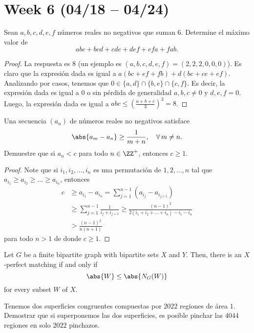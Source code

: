 \section{Week 6 (04/18 -- 04/24)}

\begin{probEG}
	Sean $a,b,c,d,e,f$ números reales no negativos que suman $6$. Determine el máximo valor de
	\[abc+bcd+cde+def+efa+fab.\]
\end{probEG}

\begin{proof}
	La respuesta es $8$ (un ejemplo es $(a,b,c,d,e,f)=(2,2,2,0,0,0)$). Es claro que la expresión dada es igual a $a(bc+ef+fb)+d(bc+ce+ef)$. Analizando por casos, tenemos que $0\in\{a,d\}\cap\{b,e\}\cap\{c,f\}$. Es decir, la expresión dada es igual a $0$ o sin pérdida de generalidad $a,b,c\ne 0$ y $d,e,f=0$. Luego, la expresión dada es igual a $abc\le\left(\frac{a+b+c}{3}\right)^3=8$.
\end{proof}

\begin{probMR}
	Una secuencia $(a_n)$ de números reales no negativos satisface
	\[\abs{a_m-a_n}\ge\frac{1}{m+n},\quad\forall\,m\ne n.\]
	Demuestre que si $a_n<c$ para todo $n\in\ZZ^+$, entonces $c\ge 1$.
\end{probMR}

\begin{proof}
	Note que si $i_1,i_2,\dots,i_n$ es una permutación de $1,2,\dots,n$ tal que $a_{i_1}\ge a_{i_2}\ge\dots\ge a_{i_n}$, entonces
	\begin{align*}
		c&\ge a_{i_1}-a_{i_n}
		=\sum_{j=1}^{n-1}(a_{i_j}-a_{i_{j+1}})\\
		&\ge\sum_{j=1}^{n-1}\frac{1}{i_j+i_{j+1}}
		\ge\frac{(n-1)^2}{2(i_1+i_2+\dots+i_n)-i_1-i_n}\\
		&>\frac{(n-1)^2}{n(n+1)}
	\end{align*}
	para todo $n>1$ de donde $c\ge 1$.
\end{proof}

\begin{theorem}
	Let $G$ be a finite bipartite graph with bipartite sets $X$ and $Y$. Then, there is an $X$-perfect matching if and only if
	\[\abs{W}\le\abs{N_G(W)}\]
	for every subset $W$ of $X$.
\end{theorem}

\begin{probEG}
	Tenemos dos superficies congruentes compuestas por $2022$ regiones de área $1$. Demostrar que si superponemos las dos superficies, es posible pinchar las $4044$ regiones en solo $2022$ pinchazos.
\end{probEG}


